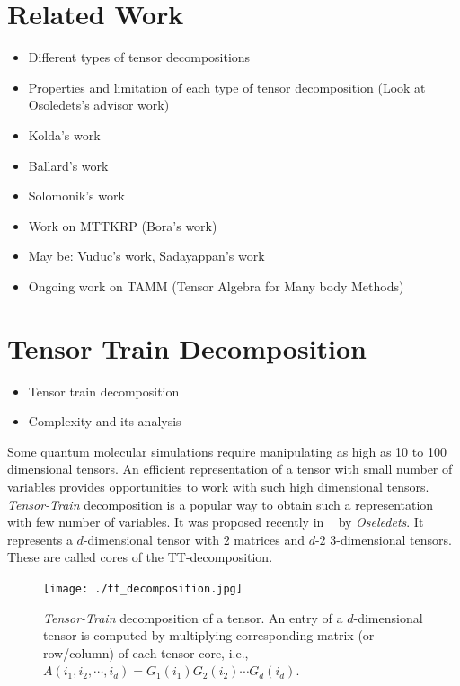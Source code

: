 \documentclass[runningheads]{llncs}
\newcommand{\ttrain}{{\it Tensor-Train}\xspace}
\begin{document}
\section{Related Work}
\label{sec:relatedWork}
\begin{itemize}
	\item Different types of tensor decompositions
	\item Properties and limitation of each type of tensor decomposition (Look at Osoledets's advisor work)
	\item Kolda's work
	\item Ballard's work
	\item Solomonik's work 
	\item Work on MTTKRP (Bora's work)
	\item May be: Vuduc's work, Sadayappan's work
	\item Ongoing work on TAMM (Tensor Algebra for Many body Methods)
\end{itemize}


\section{Tensor Train Decomposition}
\label{sec:tt}
\begin{itemize}
	\item Tensor train decomposition
	\item Complexity and its analysis
\end{itemize}

\noindent Some quantum molecular simulations require manipulating as high as 10 to 100 dimensional tensors. An efficient representation of a tensor with small number of variables provides opportunities to work with such high dimensional tensors. \ttrain decomposition is a popular way to obtain such a representation with few number of variables. It was proposed recently in ~\cite{tt} by \textit{Oseledets}. It represents a $d$-dimensional tensor with $2$ matrices and $d$-$2$ $3$-dimensional tensors. These are called cores of the TT-decomposition.

\begin{figure}
	\begin{center}

	\texttt{[image: ./tt\_decomposition.jpg]}
	\caption{\ttrain decomposition of a tensor. An entry of a $d$-dimensional tensor is computed by multiplying corresponding matrix (or row/column) of each tensor core, i.e., $A(i_1, i_2,\cdots, i_d) = G_1(i_1)G_2(i_2)\cdots G_d(i_d)$.\label{fig:ttdiagram}}
	\end{center}
\end{figure}
\end{document}

